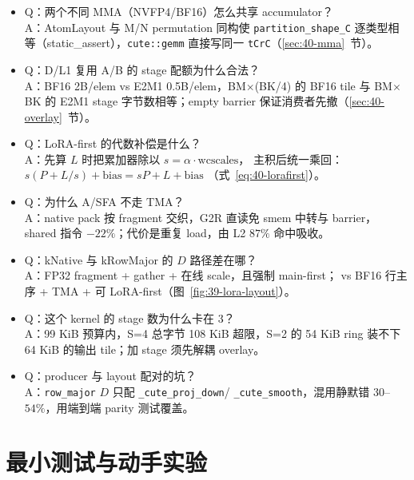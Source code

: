 \begin{itemize}[itemsep=1pt,topsep=2pt]
  \item Q：两个不同 MMA（NVFP4/BF16）怎么共享 accumulator？\\
        A：AtomLayout 与 M/N permutation 同构使 \texttt{partition\_shape\_C}
        逐类型相等（static\_assert），\texttt{cute::gemm} 直接写同一
        \texttt{tCrC}（\ref{sec:40-mma}~节）。
  \item Q：D/L1 复用 A/B 的 stage 配额为什么合法？\\
        A：BF16 2B/elem vs E2M1 0.5B/elem，BM$\times$(BK/4) 的 BF16
        tile 与 BM$\times$BK 的 E2M1 stage 字节数相等；empty barrier
        保证消费者先撤（\ref{sec:40-overlay}~节）。
  \item Q：LoRA-first 的代数补偿是什么？\\
        A：先算 $L$ 时把累加器除以 $s=\alpha\cdot\mathrm{wcscales}$，
        主积后统一乘回：$s(P+L/s)+\mathrm{bias}=sP+L+\mathrm{bias}$
        （式~\ref{eq:40-lorafirst}）。
  \item Q：为什么 A/SFA 不走 TMA？\\
        A：native pack 按 fragment 交织，G2R 直读免 smem 中转与 barrier，
        shared 指令 $-22\%$；代价是重复 load，由 L2 $87\%$ 命中吸收。
  \item Q：kNative 与 kRowMajor 的 $D$ 路径差在哪？\\
        A：FP32 fragment + gather + 在线 scale，且强制 main-first；
        vs BF16 行主序 + TMA + 可 LoRA-first（图~\ref{fig:39-lora-layout}）。
  \item Q：这个 kernel 的 stage 数为什么卡在 3？\\
        A：99 KiB 预算内，S=4 总字节 108 KiB 超限，S=2 的 54 KiB ring
        装不下 64 KiB 的输出 tile；加 stage 须先解耦 overlay。
  \item Q：producer 与 layout 配对的坑？\\
        A：\texttt{row\_major} $D$ 只配 \texttt{\_cute\_proj\_down}/
        \texttt{\_cute\_smooth}，混用静默错 $30$--$54\%$，用端到端
        parity 测试覆盖。
\end{itemize}

\section{最小测试与动手实验}

